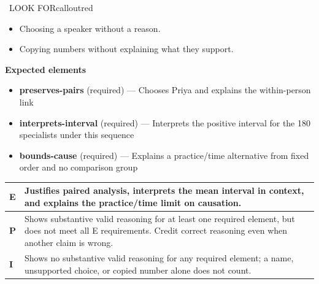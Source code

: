 \documentclass[11pt]{article}
\begin{document}
\begin{callout}{\IconWarn\ LOOK FOR}{calloutred}
\begin{itemize}[leftmargin=1.5em,itemsep=2pt,topsep=2pt]
  \item Choosing a speaker without a reason.
  \item Copying numbers without explaining what they support.
\end{itemize}
\end{callout}


\textbf{Expected elements}
\begin{itemize}[leftmargin=1.5em,itemsep=2pt,topsep=2pt]
  \item \textbf{preserves-pairs} (required) --- Chooses Priya and explains the within-person link
  \item \textbf{interprets-interval} (required) --- Interprets the positive interval for the 180 specialists under this sequence
  \item \textbf{bounds-cause} (required) --- Explains a practice/time alternative from fixed order and no comparison group
\end{itemize}

{\small\renewcommand{\arraystretch}{1.25}
\noindent\begin{tabular}{|p{0.5in}|p{5.9in}|}
\hline
\textbf{E} & Justifies paired analysis, interprets the mean interval in context, and explains the practice/time limit on causation. \\ \hline
\textbf{P} & Shows substantive valid reasoning for at least one required element, but does not meet all E requirements. Credit correct reasoning even when another claim is wrong. \\ \hline
\textbf{I} & Shows no substantive valid reasoning for any required element; a name, unsupported choice, or copied number alone does not count. \\ \hline
\end{tabular}}

\clearpage
{}
\end{document}
